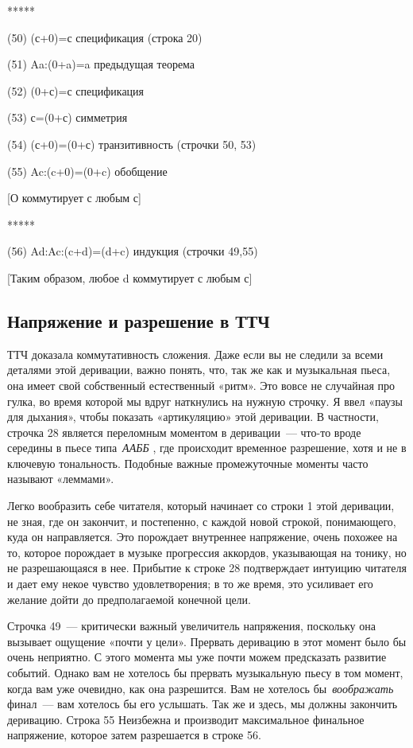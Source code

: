 \documentclass[../main.tex]{subfiles}
\begin{document}
*****

(50) (с+0)=с спецификация (строка 20)

(51) Aa:(0+a)=a предыдущая теорема

(52) (0+с)=с спецификация

(53) с=(0+с) симметрия

(54) (с+0)=(0+с) транзитивность (строчки 50, 53)

(55) Ac:(c+0)=(0+c) обобщение

{[}О коммутирует с любым с{]}

*****

(56) Ad:Ac:(c+d)=(d+c) индукция (строчки 49,55)

{[}Таким образом, любое d коммутирует с любым с{]}


\subsection{Напряжение и разрешение в ТТЧ}

ТТЧ доказала коммутативность сложения. Даже если вы не следили за всеми деталями этой деривации, важно понять, что, так же как и музыкальная пьеса, она имеет свой собственный естественный «ритм». Это вовсе не случайная про гулка, во время которой мы вдруг наткнулись на нужную строчку. Я ввел «паузы для дыхания», чтобы показать «артикуляцию» этой деривации. В частности, строчка 28 является переломным моментом в деривации~--- что-то вроде середины в пьесе типа~\emph{ААББ} , где происходит временное разрешение, хотя и не в ключевую тональность. Подобные важные промежуточные моменты часто называют «леммами».

Легко вообразить себе читателя, который начинает со строки 1 этой деривации, не зная, где он закончит, и постепенно, с каждой новой строкой, понимающего, куда он направляется. Это порождает внутреннее напряжение, очень похожее на то, которое порождает в музыке прогрессия аккордов, указывающая на тонику, но не разрешающаяся в нее. Прибытие к строке 28 подтверждает интуицию читателя и дает ему некое чувство удовлетворения; в то же время, это усиливает его желание дойти до предполагаемой конечной цели.

Строчка 49~--- критически важный увеличитель напряжения, поскольку она вызывает ощущение «почти у цели». Прервать деривацию в этот момент было бы очень неприятно. С этого момента мы уже почти можем предсказать развитие событий. Однако вам не хотелось бы прервать музыкальную пьесу в том момент, когда вам уже очевидно, как она разрешится. Вам не хотелось бы~\emph{воображать~} финал~--- вам хотелось бы его услышать. Так же и здесь, мы должны закончить деривацию. Строка 55 Неизбежна и производит максимальное финальное напряжение, которое затем разрешается в строке 56.
\end{document}
